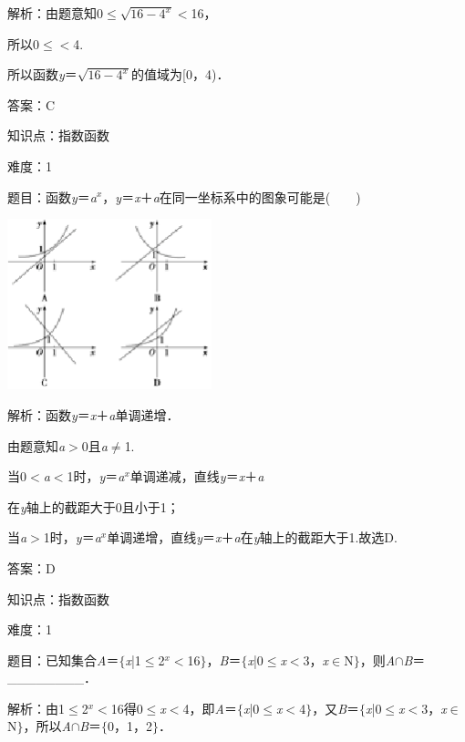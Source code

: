 \documentclass{article} %
\begin{document}
解析：由题意知0$\mathrm{\le}$$\sqrt{16-4^{x}}$$\mathrm{<}$16，

所以0$\mathrm{\le}$$\mathrm{<}$4.

所以函数\textit{y}＝$\sqrt{16-4^{x}}$的值域为[0，4)．

答案：C

知识点：指数函数

难度：1

题目：函数\textit{y}＝\textit{a${}^{x}$}，\textit{y}＝\textit{x}＋\textit{a}在同一坐标系中的图象可能是(　　)

\includegraphics*[width=2.34in, height=1.95in, keepaspectratio=false]{image52}

解析：函数\textit{y}＝\textit{x}＋\textit{a}单调递增．

由题意知\textit{a}$\mathrm{>}$0且\textit{a}$\mathrm{\neq}$1.

当0$\mathrm{<}$\textit{a}$\mathrm{<}$1时，\textit{y}＝\textit{a${}^{x}$}单调递减，直线\textit{y}＝\textit{x}＋\textit{a}

在\textit{y}轴上的截距大于0且小于1；

当\textit{a}$\mathrm{>}$1时，\textit{y}＝\textit{a${}^{x}$}单调递增，直线\textit{y}＝\textit{x}＋\textit{a}在\textit{y}轴上的截距大于1.故选D.

答案：D

知识点：指数函数

难度：1

题目：已知集合\textit{A}＝$\mathrm{\{}$\textit{x}|1$\mathrm{\le}$2\textit{${}^{x}$}$\mathrm{<}$16$\mathrm{\}}$，\textit{B}＝$\mathrm{\{}$\textit{x}|0$\mathrm{\le}$\textit{x}$\mathrm{<}$3，\textit{x}$\mathrm{\in}$N$\mathrm{\}}$，则\textit{A}$\mathrm{\cap}$\textit{B}＝\_\_\_\_\_\_\_\_．

解析：由1$\mathrm{\le}$2\textit{${}^{x}$}$\mathrm{<}$16得0$\mathrm{\le}$\textit{x}$\mathrm{<}$4，即\textit{A}＝$\mathrm{\{}$\textit{x}|0$\mathrm{\le}$\textit{x}$\mathrm{<}$4$\mathrm{\}}$，又\textit{B}＝$\mathrm{\{}$\textit{x}|0$\mathrm{\le}$\textit{x}$\mathrm{<}$3，\textit{x}$\mathrm{\in}$N$\mathrm{\}}$，所以\textit{A}$\mathrm{\cap}$\textit{B}＝$\mathrm{\{}$0，1，2$\mathrm{\}}$．
\end{document}
